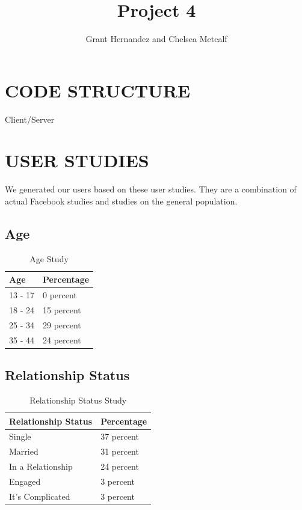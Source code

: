 \documentclass{article}
\begin{document}
\title{Project 4}
 
\author{Grant Hernandez and Chelsea Metcalf}
 
\maketitle %
 
\section{CODE STRUCTURE}
Client/Server

\section{USER STUDIES}
We generated our users based on these user studies. They are a combination of actual Facebook studies and studies on the general population.
\subsection{Age}
\begin{table}[H]
\centering
\begin{tabular}{|p{2cm}||p{2cm}|} 
 \hline
 Age & Percentage \\ [0.5ex] 
 \hline\hline
 13 - 17 & 0 percent \\
 \hline
 18 - 24 & 15 percent \\
 \hline
 25 - 34 & 29 percent \\
 \hline
 35 - 44 & 24 percent \\ [1ex] 
 \hline
\end{tabular}
\caption{Age Study \cite{sproutsocialwebsite}}
\label{table:1}
\end{table}

\subsection{Relationship Status}
\begin{table}[H]
\centering
\begin{tabular}{|p{3cm}||p{3cm}|} 
 \hline
 Relationship Status & Percentage \\ [0.5ex] 
 \hline\hline
 Single & 37 percent \\
 \hline
 Married & 31 percent \\
 \hline
 In a Relationship & 24 percent \\
 \hline
 Engaged & 3 percent \\
 \hline
 It's Complicated & 3 percent \\ [1ex] 
 \hline
\end{tabular}
\caption{Relationship Status Study \cite{relstatuswebsite}}
\label{table:2}
\end{table}
\end{document}
